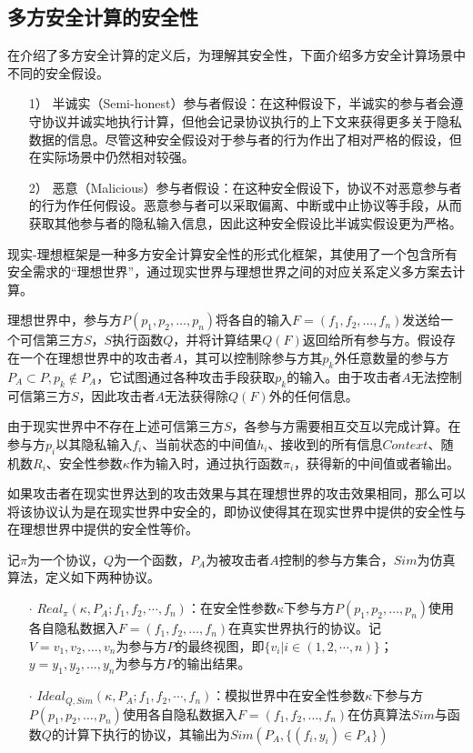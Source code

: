 \subsection{多方安全计算的安全性}
在介绍了多方安全计算的定义后，为理解其安全性，下面介绍多方安全计算场景中不同的安全假设。

\begin{itemize}
	\item [1）]
	半诚实（Semi-honest）参与者假设：在这种假设下，半诚实的参与者会遵守协议并诚实地执行计算，但他会记录协议执行的上下文来获得更多关于隐私数据的信息。尽管这种安全假设对于参与者的行为作出了相对严格的假设，但在实际场景中仍然相对较强。
	\item [2）]
	恶意（Malicious）参与者假设：在这种安全假设下，协议不对恶意参与者的行为作任何假设。恶意参与者可以采取偏离、中断或中止协议等手段，从而获取其他参与者的隐私输入信息，因此这种安全假设比半诚实假设更为严格。
\end{itemize}

现实-理想框架是一种多方安全计算安全性的形式化框架，其使用了一个包含所有安全需求的“理想世界”，通过现实世界与理想世界之间的对应关系定义多方案去计算。

理想世界中，参与方$P(p_1, p_2, \dots, p_n)$将各自的输入$F=(f_1, f_2, \dots, f_n)$发送给一个可信第三方$S$，$S$执行函数$Q$，并将计算结果$Q(F)$返回给所有参与方。假设存在一个在理想世界中的攻击者$A$，其可以控制除参与方其$p_k$外任意数量的参与方$P_A\subset P,p_k\notin P_A$，它试图通过各种攻击手段获取$p_k$的输入。由于攻击者$A$无法控制可信第三方$S$，因此攻击者$A$无法获得除$Q(F)$外的任何信息。

由于现实世界中不存在上述可信第三方$S$，各参与方需要相互交互以完成计算。在参与方$p_i$以其隐私输入$f_i$、当前状态的中间值$h_i$、接收到的所有信息$Context$、随机数$R_i$、安全性参数$\kappa$作为输入时，通过执行函数$\pi_i$，获得新的中间值或者输出。

如果攻击者在现实世界达到的攻击效果与其在理想世界的攻击效果相同，那么可以将该协议认为是在现实世界中安全的，即协议使得其在现实世界中提供的安全性与在理想世界中提供的安全性等价。

\begin{definition}{}
	记$\pi$为一个协议，$Q$为一个函数，$P_A$为被攻击者$A$控制的参与方集合，$Sim$为仿真算法，定义如下两种协议。
	\begin{itemize}
		\item [$\cdot$]
			$Real_\pi(\kappa,P_A;f_1,f_2,\cdots,f_n)$：在安全性参数$\kappa$下参与方$P(p_1, p_2, \dots, p_n)$使用各自隐私数据入$F=(f_1, f_2, \dots, f_n)$在真实世界执行的协议。记$V={v_1, v_2, \dots, v_n}$为参与方$P$的最终视图，即$\{v_i|i\in (1,2,\cdots,n)\}$；$y={y_1, y_2, \dots, y_n}$为参与方$P$的输出结果。
		\item [$\cdot$]
			$Ideal_{Q,Sim}(\kappa,P_A;f_1,f_2,\cdots,f_n)$：模拟世界中在安全性参数$\kappa$下参与方$P(p_1, p_2, \dots, p_n)$使用各自隐私数据入$F=(f_1, f_2, \dots, f_n)$在仿真算法$Sim$与函数$Q$的计算下执行的协议，其输出为$Sim(P_A,\{(f_i,y_i)\in P_A\})$			
	\end{itemize}

\end{definition}

